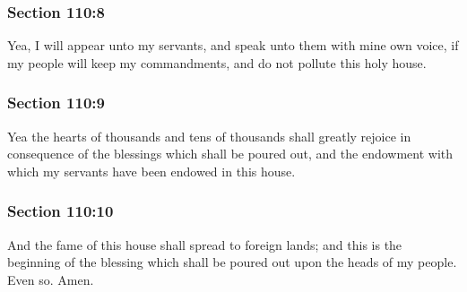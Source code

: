	\subsubsection{Section 110:8} %
		\label{DC110-8}

		Yea, I will appear unto my servants, and speak unto them with mine own voice, if my people will keep my commandments, and do not pollute this holy house.


	\subsubsection{Section 110:9} %
		\label{DC110-9}

		Yea the hearts of thousands and tens of thousands shall greatly rejoice in consequence of the blessings which shall be poured out, and the endowment with which my servants have been endowed in this house.


	\subsubsection{Section 110:10} %
		\label{DC110-10}

		And the fame of this house shall spread to foreign lands; and this is the beginning of the blessing which shall be poured out upon the heads of my people.  Even so.  Amen.


